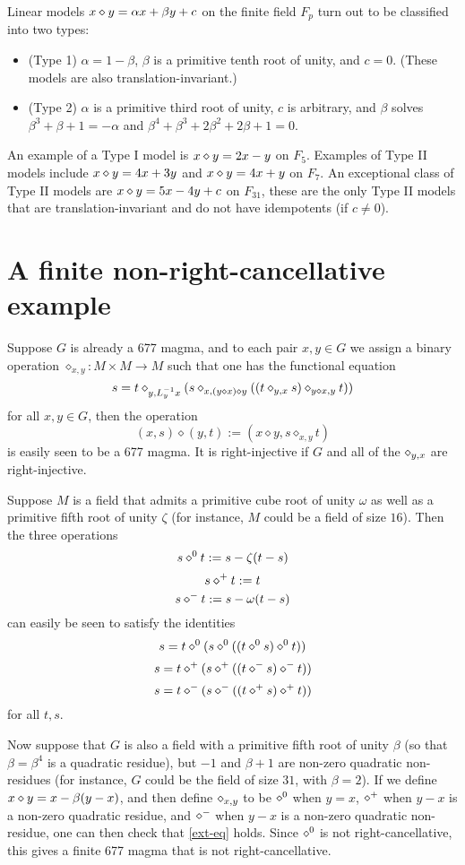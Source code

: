 Linear models $x \diamond y = \alpha x + \beta y + c$ on the finite field $F_p$ turn out to be classified into two types:
\begin{itemize}
\item (Type 1) $\alpha=1-\beta$, $\beta$ is a primitive tenth root of unity, and $c=0$.  (These models are also translation-invariant.)
\item (Type 2) $\alpha$ is a primitive third root of unity, $c$ is arbitrary, and $\beta$ solves $\beta^3+\beta+1=-\alpha$ and $\beta^4+\beta^3+2\beta^2+2\beta+1=0$.
\end{itemize}
An example of a Type I model is $x \diamond y = 2x-y$ on $F_5$.  Examples of Type II models include $x \diamond y = 4x+3y$ and $x \diamond y = 4x+y$ on $F_7$.  An exceptional class of Type II models are $x \diamond y = 5x-4y+c$ on $F_{31}$, these are the only Type II models that are translation-invariant and do not have idempotents (if $c \neq 0$).

\section{A finite non-right-cancellative example}

Suppose $G$ is already a 677 magma, and to each pair $x,y \in G$ we assign a binary operation $\diamond_{x,y}: M \times M \to M$ such that one has the functional equation
\begin{equation}\label{ext-eq}
  s = t \diamond_{y,L_y^{-1} x} (s \diamond_{x, (y \diamond x) \diamond y} ((t \diamond_{y,x} s) \diamond_{y \diamond x, y} t))
\end{equation}
for all $x,y \in G$, then the operation
$$ (x,s) \diamond (y,t) := (x \diamond y, s \diamond_{x,y} t)$$
is easily seen to be a 677 magma.  It is right-injective if $G$ and all of the $\diamond_{y,x}$ are right-injective.

Suppose $M$ is a field that admits a primitive cube root of unity $\omega$ as well as a primitive fifth root of unity $\zeta$ (for instance, $M$ could be a field of size $16$).  Then the three operations
$$ s \diamond^0 t := s - \zeta(t-s)$$
$$ s \diamond^+ t := t$$
$$ s \diamond^- t := s - \omega(t-s)$$
can easily be seen to satisfy the identities
$$s = t \diamond^0 (s \diamond^0 ((t \diamond^0 s) \diamond^0 t))$$
$$s = t \diamond^+ (s \diamond^+ ((t \diamond^- s) \diamond^- t))$$
$$s = t \diamond^- (s \diamond^- ((t \diamond^+ s) \diamond^+ t))$$
for all $t,s$.

Now suppose that $G$ is also a field with a primitive fifth root of unity $\beta$ (so that $\beta = \beta^4$ is a quadratic residue), but $-1$ and $\beta+1$ are non-zero quadratic non-residues (for instance, $G$ could be the field of size $31$, with $\beta=2$).  If we define $x \diamond y = x - \beta(y-x)$, and then define $\diamond_{x,y}$ to be $\diamond^0$ when $y=x$, $\diamond^+$ when $y-x$ is a non-zero quadratic residue, and $\diamond^-$ when $y-x$ is a non-zero quadratic non-residue, one can then check that \eqref{ext-eq} holds. Since $\diamond^0$ is not right-cancellative, this gives a finite 677 magma that is not right-cancellative.


